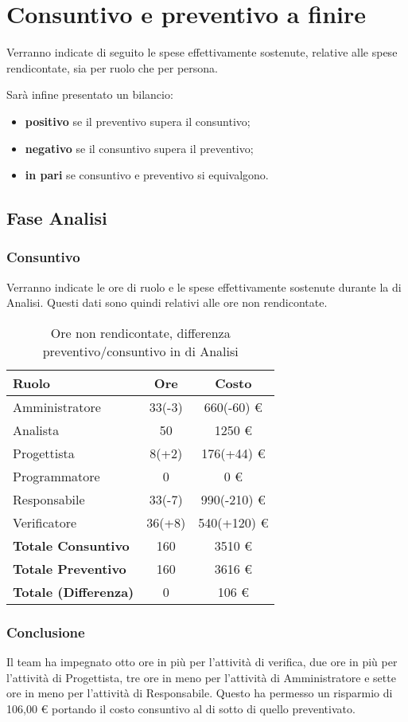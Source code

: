 \section{Consuntivo e preventivo a finire}
Verranno indicate di seguito le spese effettivamente sostenute, relative alle spese rendicontate, sia per ruolo che per persona.

Sar\`a infine presentato un bilancio:
\begin{itemize}
\item \textbf{positivo} se il preventivo supera il consuntivo;
\item \textbf{negativo} se il consuntivo supera il preventivo;
\item \textbf{in pari} se consuntivo e preventivo si equivalgono.
\end{itemize}


\subsection{Fase Analisi}
\subsubsection{Consuntivo}
Verranno indicate le ore di ruolo e le spese effettivamente sostenute durante la  di Analisi. Questi dati sono quindi relativi alle ore non rendicontate.

\begin{table}[H]
	\centering
	\begin{tabular}{ l c c }
		\textbf{Ruolo} & \textbf{Ore} & \textbf{Costo} \\
		\hline
		Amministratore & 33(-3) & 660(-60) \euro{} \\
		Analista & 50 & 1250 \euro{} \\
		Progettista & 8(+2) & 176(+44) \euro{} \\
		Programmatore & 0 & 0 \euro{} \\
		Responsabile & 33(-7) & 990(-210) \euro{} \\
		Verificatore & 36(+8) & 540(+120) \euro{} \\
		\hline
		\textbf{Totale Consuntivo} & 160 & 3510 \euro{} \\
		\hline
		\textbf{Totale Preventivo} & 160 & 3616 \euro{} \\
		\hline
		\textbf{Totale (Differenza)} & 0 & 106 \euro{} \\
		\hline
	\end{tabular}
	\caption{Ore non rendicontate, differenza preventivo/consuntivo in  di Analisi}
\end{table}



\subsubsection{Conclusione}
Il team ha impegnato otto ore in pi\`u per l'attivit\`a di verifica, due ore in pi\`u per l'attivit\`a di Progettista, tre ore in meno per l'attivit\`a di Amministratore e sette ore in meno per l'attivit\`a di Responsabile. Questo ha permesso un risparmio di 106,00 \euro{} portando il costo consuntivo al di sotto di quello preventivato.
